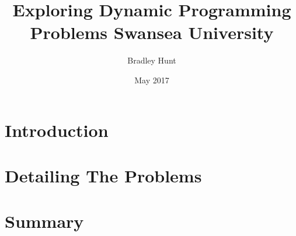 \documentclass[11pt]{report}
\title{
	{Exploring Dynamic Programming Problems}
	{\large Swansea University}
}
\author{Bradley Hunt}
\date{May 2017}
\begin{document}
\maketitle

\tableofcontents

\chapter{Introduction}


\chapter{Detailing The Problems}


\chapter{Summary}

\end{document}
